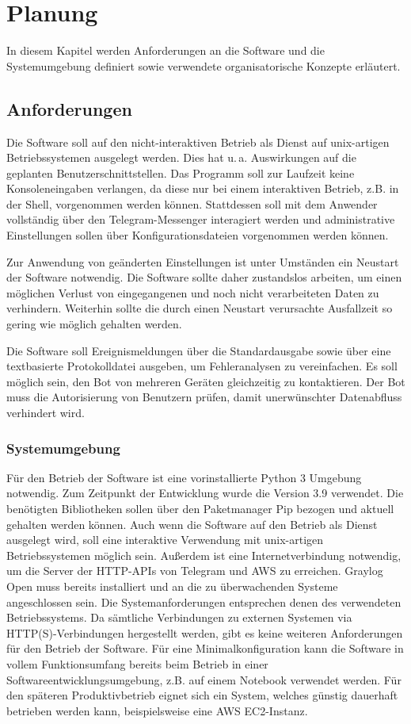 \chapter{Planung}
\label{cha:planung}

In diesem Kapitel werden Anforderungen an die Software und die Systemumgebung definiert sowie verwendete organisatorische Konzepte erläutert.

\section{Anforderungen}

Die Software soll auf den nicht-interaktiven Betrieb als Dienst auf unix-artigen Betriebssystemen ausgelegt werden. Dies hat u.\,a. Auswirkungen auf die geplanten Benutzerschnittstellen. Das Programm soll zur Laufzeit keine Konsoleneingaben verlangen, da diese nur bei einem interaktiven Betrieb, z.B. in der Shell, vorgenommen werden können. Stattdessen soll mit dem Anwender vollständig über den Telegram-Messenger interagiert werden und administrative Einstellungen sollen über Konfigurationsdateien vorgenommen werden können. 

Zur Anwendung von geänderten Einstellungen ist unter Umständen ein Neustart der Software notwendig. Die Software sollte daher zustandslos arbeiten, um einen möglichen Verlust von eingegangenen und noch nicht verarbeiteten Daten zu verhindern. Weiterhin sollte die durch einen Neustart verursachte Ausfallzeit so gering wie möglich gehalten werden. 

Die Software soll Ereignismeldungen über die Standardausgabe sowie über eine textbasierte Protokolldatei ausgeben, um Fehleranalysen zu vereinfachen. Es soll möglich sein, den Bot von mehreren Geräten gleichzeitig zu kontaktieren. Der Bot muss die Autorisierung von Benutzern prüfen, damit unerwünschter Datenabfluss verhindert wird.

\subsection{Systemumgebung}
Für den Betrieb der Software ist eine vorinstallierte Python 3 Umgebung notwendig. Zum Zeitpunkt der Entwicklung wurde die Version 3.9 verwendet. Die benötigten Bibliotheken sollen über den Paketmanager Pip bezogen und aktuell gehalten werden können. Auch wenn die Software auf den Betrieb als Dienst ausgelegt wird, soll eine interaktive Verwendung mit unix-artigen Betriebssystemen möglich sein. Außerdem ist eine Internetverbindung notwendig, um die Server der HTTP-APIs von Telegram und AWS zu erreichen. Graylog Open muss bereits installiert und an die zu überwachenden Systeme angeschlossen sein. Die Systemanforderungen entsprechen denen des verwendeten Betriebssystems. Da sämtliche Verbindungen zu externen Systemen via HTTP(S)-Verbindungen hergestellt werden, gibt es keine weiteren Anforderungen für den Betrieb der Software. Für eine Minimalkonfiguration kann die Software in vollem Funktionsumfang bereits beim Betrieb in einer Softwareentwicklungsumgebung, z.B. auf einem Notebook verwendet werden. Für den späteren Produktivbetrieb eignet sich ein System, welches günstig dauerhaft betrieben werden kann, beispielsweise eine AWS EC2-Instanz.

